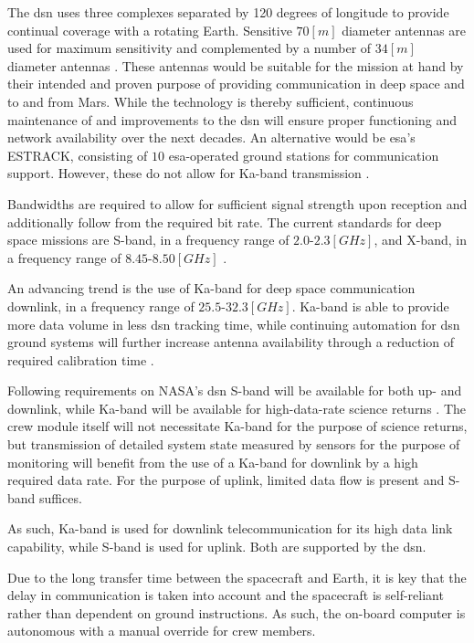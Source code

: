 The \gls{dsn} uses three complexes separated by 120 degrees of longitude to provide continual coverage with a rotating Earth. Sensitive $70 \left[m\right]$ diameter antennas are used for maximum sensitivity and complemented by a number of $34 \left[m\right]$ diameter antennas \cite{Wertz2011}. These antennas would be suitable for the mission at hand by their intended and proven purpose of providing communication in deep space and to and from Mars. While the technology is thereby sufficient, continuous maintenance of and improvements to the \gls{dsn} will ensure proper functioning and network availability over the next decades. An alternative would be \gls{esa}'s ESTRACK, consisting of $10$ \gls{esa}-operated ground stations for communication support. However, these do not allow for Ka-band transmission \cite[p.631]{Wertz2011}.

Bandwidths are required to allow for sufficient signal strength upon reception and additionally follow from the required bit rate. The current standards for deep space missions are S-band, in a frequency range of $2.0\mbox{-}2.3 \left[GHz\right]$, and X-band, in a frequency range of $8.45\mbox{-}8.50 \left[GHz\right]$ \cite{Wertz2011}.

An advancing trend is the use of Ka-band for deep space communication downlink, in a frequency range of $25.5\mbox{-}32.3\left[GHz\right]$. Ka-band is able to provide more data volume in less \gls{dsn} tracking time, while continuing automation for \gls{dsn} ground systems will further increase antenna availability through a reduction of required calibration time \cite{Edwards1999}. 

Following requirements on NASA's \gls{dsn} S-band will be available for both up- and downlink, while Ka-band will be available for high-data-rate science returns \cite{Labelle2012}. The crew module itself will not necessitate Ka-band for the purpose of science returns, but transmission of detailed system state measured by sensors for the purpose of monitoring will benefit from the use of a Ka-band for downlink by a high required data rate. For the purpose of uplink, limited data flow is present and S-band suffices.%

As such, Ka-band is used for downlink telecommunication for its high data link capability, while S-band is used for uplink. Both are supported by the \gls{dsn}. 

Due to the long transfer time between the spacecraft and Earth, it is key that the delay in communication is taken into account and the spacecraft is self-reliant rather than dependent on ground instructions. As such, the on-board computer is autonomous with a manual override for crew members.
